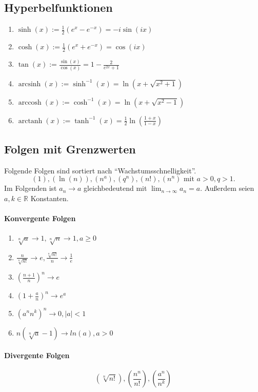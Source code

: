 \documentclass[a4paper, 9pt, DIV=24]{scrartcl}
\DeclareMathOperator{\arcsinh}{arcsinh}
\DeclareMathOperator{\arccosh}{arccosh}
\DeclareMathOperator{\arctanh}{arctanh}
\begin{document}
\subsection{Hyperbelfunktionen}
\begin{enumerate}[label={(}\arabic*{)}]
 \item $\sinh(x) := \frac{1}{2}(e^x-e^{-x}) = -i\sin(ix)$
 \item $\cosh(x) := \frac{1}{2}(e^x+e^{-x}) = \cos(ix)$
 \item $\tan(x) := \frac{\sin(x)}{\cos(x)} = 1 - \frac{2}{e^{2x}+1}$
 \item $\arcsinh(x) := \sinh^{-1}(x) = \ln(x + \sqrt{x^2+1})$
 \item $\arccosh(x) := \cosh^{-1}(x) = \ln(x + \sqrt{x^2-1})$
 \item $\arctanh(x) := \tanh^{-1}(x) = \frac{1}{2}\ln(\frac{1+x}{1-x})$
\end{enumerate}

\subsection{Folgen mit Grenzwerten}
Folgende Folgen sind sortiert nach ``Wachstumsschnelligkeit''.
\[ (1), (\ln(n)), (n^{a}), (q^n), (n!), (n^n) \text{ mit } a > 0, q > 1.\]
Im Folgenden ist $a_n \rightarrow a$ gleichbedeutend mit $\lim_{n\rightarrow\infty} a_n = a$.
Außerdem seien $a,k\in\mathbb{R}$ Konstanten.
\paragraph{Konvergente Folgen}
\begin{enumerate}[label={(}\arabic*{)}]
 \item $\sqrt[n]{a} \rightarrow 1, \sqrt[n]{n} \rightarrow 1, a \geq 0$
 \item $\frac{n}{\sqrt[n]{n!}} \rightarrow e, \frac{\sqrt[n]{n!}}{n} \rightarrow \frac{1}{e}$
 \item $(\frac{n+1}{n})^n \rightarrow e$
 \item $(1 + \frac{a}{n})^n \rightarrow e^a$
 \item $(a^nn^k)^n \rightarrow 0, |a| < 1$
 \item $n(\sqrt[n]{a}-1) \rightarrow ln(a), a > 0$
\end{enumerate}
\paragraph{Divergente Folgen}
\[ (\sqrt[n]{n!}), (\frac{n^n}{n!}), (\frac{a^n}{n^k}) \]
\end{document}
